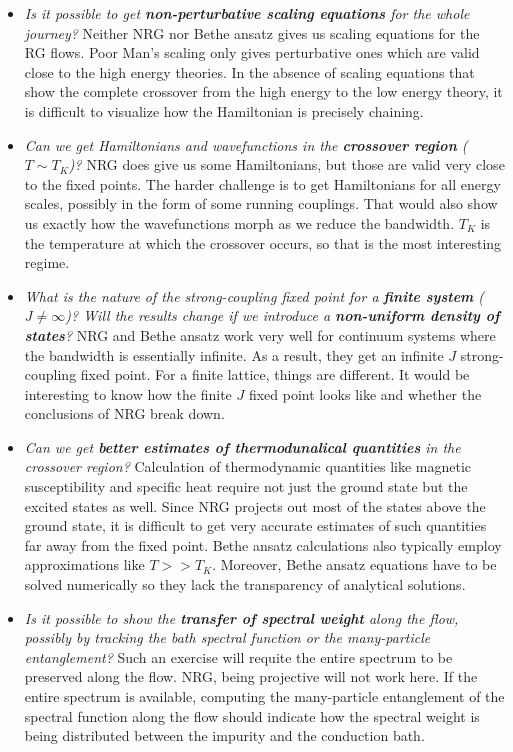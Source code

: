 \documentclass[14pt]{extarticle}
\numberwithin{equation}{section}
\begin{document}
\begin{itemize}
	\item \textit{Is it possible to get \textbf{non-perturbative scaling equations} for the whole journey?}
	Neither NRG nor Bethe ansatz gives us scaling equations for the RG flows. Poor Man's scaling only gives perturbative ones which are valid close to the high energy theories. In the absence of scaling equations that show the complete crossover from the high energy to the low energy theory, it is difficult to visualize how the Hamiltonian is precisely chaining.
	\item \textit{Can we get Hamiltonians and wavefunctions in the \textbf{crossover region} (\(T \sim T_K\))?}
		NRG does give us some Hamiltonians, but those are valid very close to the fixed points. The harder challenge is to get Hamiltonians for all energy scales, possibly in the form of some running couplings. That would also show us exactly how the wavefunctions morph as we reduce the bandwidth. \(T_K\) is the temperature at which the crossover occurs, so that is the most interesting regime.
	\item \textit{What is the nature of the strong-coupling fixed point for a \textbf{finite system} (\(J \neq \infty\))? Will the results change if we introduce a \textbf{non-uniform density of states}?}
		NRG and Bethe ansatz work very well for continuum systems where the bandwidth is essentially infinite. As a result, they get an infinite \(J\) strong-coupling fixed point. For a finite lattice, things are different. It would be interesting to know how the finite \(J\) fixed point looks like and whether the conclusions of NRG break down.
	\item \textit{Can we get \textbf{better estimates of thermodunalical quantities} in the crossover region?}
		Calculation of thermodynamic quantities like magnetic susceptibility and specific heat require not just the ground state but the excited states as well. Since NRG projects out most of the states above the ground state, it is difficult to get very accurate estimates of such quantities far away from the fixed point. Bethe ansatz calculations also typically  employ approximations like \(T>>T_K\). Moreover, Bethe ansatz equations have to be solved numerically so they lack the transparency of analytical solutions.
	\item \textit{Is it possible to show the \textbf{transfer of spectral weight} along the flow, possibly by tracking the bath spectral function or the many-particle entanglement?}
	Such an exercise will requite the entire spectrum to be preserved along the flow. NRG, being projective will not work here. If the entire spectrum is available, computing the many-particle entanglement of the spectral function along the flow should indicate how the spectral weight is being distributed between the impurity and the conduction bath.

\end{itemize}
\end{document}
